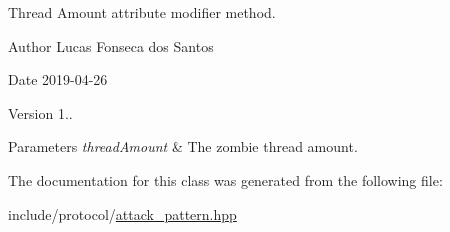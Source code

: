 Thread Amount attribute modifier method. \begin{DoxyAuthor}{Author}
Lucas Fonseca dos Santos 
\end{DoxyAuthor}
\begin{DoxyDate}{Date}
2019-\/04-\/26 
\end{DoxyDate}
\begin{DoxyVersion}{Version}
1..
\end{DoxyVersion}

\begin{DoxyParams}{Parameters}
{\em thread\+Amount} & The zombie thread amount. \\
\hline
\end{DoxyParams}


The documentation for this class was generated from the following file\+:\begin{DoxyCompactItemize}
\item 
include/protocol/\mbox{\hyperlink{attack__pattern_8hpp}{attack\+\_\+pattern.\+hpp}}\end{DoxyCompactItemize}

